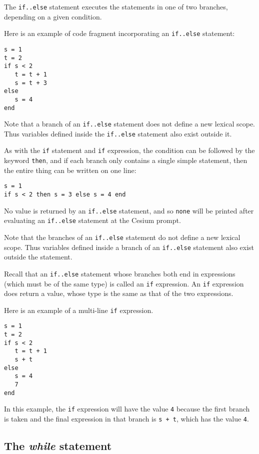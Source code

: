 \documentclass[a4paper,10pt]{article}
\newcommand{\code}{\lstinline}
\begin{document}
{The \code{if..else} statement executes the statements in one of two branches, depending on a given
condition.

Here is an example of code fragment incorporating an \code{if..else} statement:

\begin{lstlisting}
s = 1
t = 2
if s < 2
   t = t + 1
   s = t + 3
else
   s = 4
end
\end{lstlisting}

Note that a branch of an \code{if..else} statement does not define a new lexical scope. Thus
variables defined inside the \code{if..else} statement also exist outside it.

As with the \code{if} statement and \code{if} expression, the condition can be followed by the keyword
\code{then}, and if each branch only contains a single simple statement, then the entire thing can
be written on one line:

\begin{lstlisting}
s = 1
if s < 2 then s = 3 else s = 4 end
\end{lstlisting}

No value is returned by an \code{if..else} statement, and so \code{none} will be printed after
evaluating an \code{if..else} statement at the Cesium prompt.

Note that the branches of an \code{if..else} statement do not define a new lexical scope. Thus
variables defined inside a branch of an \code{if..else} statement also exist outside the statement.

Recall that an \code{if..else} statement whose branches both end in expressions (which must be of 
the same type) is called an \code{if} expression. An \code{if} expression does return a value, whose 
type is the same as that of the two expressions. 

Here is an example of a multi-line \code{if} expression.

\begin{lstlisting}
s = 1
t = 2
if s < 2
   t = t + 1
   s + t
else
   s = 4
   7
end
\end{lstlisting}

In this example, the \code{if} expression will have the value \code{4} because the first branch is 
taken and the final expression in that branch is \code{s + t}, which has the value \code{4}.

\subsection{The \textit{while} statement}

}
\end{document}
